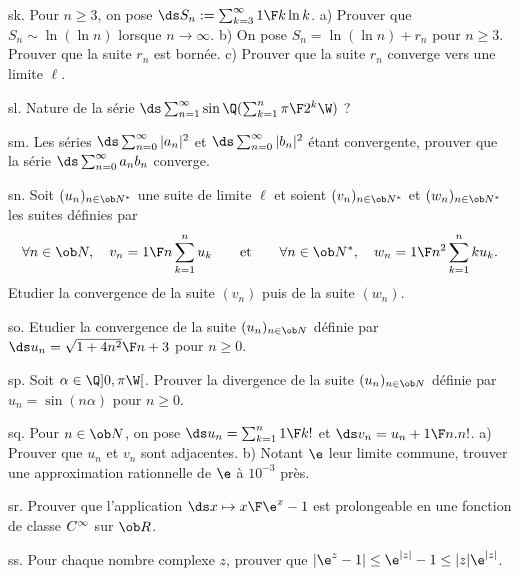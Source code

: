 \exo [Level=2,Fight=0,Learn=0,Type=\Exercices,Field=\Suites,Origin=] sk. 
Pour $n\ge3$, on pose $\ds S_n:=\sum_{k=3}^\infty{1\F k\ln k}$. \pn
a) Prouver que $S_n\sim\ln(\ln n)$ lorsque $n\to\infty$. \pn
b) On pose $S_n=\ln(\ln n)+r_n$ pour $n\ge3$. Prouver que la suite $r_n$ est bornée. \pn
c) Prouver que la suite $r_n$ converge vers une limite $\ell$. 

\exo [Level=2,Fight=0,Learn=0,Type=\Exercices,Field=\SériesNumériques,Origin=] sl. 
Nature de la série $\ds\sum_{n=1}^\infty\sin\Q(\sum_{k=1}^n{\pi\F 2^k}\W)$ ? 

\exo [Level=2,Fight=0,Learn=0,Type=\Exercices,Field=\SériesNumériques,Origin=] sm. 
Les séries $\ds\sum_{n=0}^\infty|a_n|^2$ et $\ds\sum_{n=0}^\infty|b_n|^2$ étant convergente, 
prouver que la série $\ds\sum_{n=0}^\infty a_nb_n$ converge. 

\exo [Level=2,Fight=0,Learn=0,Type=\Exercices,Field=\SériesNumériques,Origin=] sn. 
Soit $(u_n)_{n\in\ob N^*}$ une suite de limite $\ell$ et soient $(v_n)_{n\in\ob N^*}$ 
et $(w_n)_{n\in\ob N^*}$  
les suites définies par 
$$
\forall n\in\ob N, \quad v_n={1\F n}\sum_{k=1}^n u_k\qquad\hbox{et}\qquad\forall n\in\ob N^*, \quad w_n={1\F n^2}\sum_{k=1}^nku_k.
$$
Etudier la convergence de la suite $(v_n)$ puis de la suite $(w_n)$. 

\exo [Level=1,Fight=0,Learn=0,Type=\Exercices,Field=\Suites,Origin=] so. 
Etudier la convergence de la suite $(u_n)_{n\in\ob N}$ définie par 
$\ds u_n={\sqrt{1+4n^2}\F n+3}$ pour $n\ge0$. 

\exo [Level=1,Fight=0,Learn=0,Type=\Exercices,Field=\Suites,Origin=] sp. 
Soit $\alpha\in\Q]0,\pi\W[$. Prouver la divergence de la suite $(u_n)_{n\in\ob N}$ 
définie par $u_n=\sin(n\alpha)$ pour $n\ge0$. 

\exo [Level=1,Fight=0,Learn=0,Type=\Exercices,Field=\Suites,Origin=] sq. 
Pour $n\in\ob N$, on pose $\ds u_n=\sum_{k=1}^n{1\F k!}$ et $\ds v_n=u_n+{1\F n.n!}$. \pn
a) Prouver que $u_n$ et $v_n$ sont adjacentes. \pn 
b) Notant $\e$ leur limite commune, trouver une approximation rationnelle de $\e$ à $10^{-3}$ près. 

\exo [Level=2,Fight=0,Learn=0,Type=\Exercices,Field=\SériesEntières,Origin=] sr. 
Prouver que l'application $\ds x\mapsto {x\F \e^x-1}$ est prolongeable en une fonction de classe $\sc C^\infty$ sur $\ob R$. 

\exo [Level=2,Fight=0,Learn=0,Type=\Exercices,Field=\NombresComplexes,Origin=] ss. 
Pour chaque nombre complexe $z$, prouver que $|\e^z-1|\le \e^{|z|}-1\le |z|\e^{|z|}$. 

